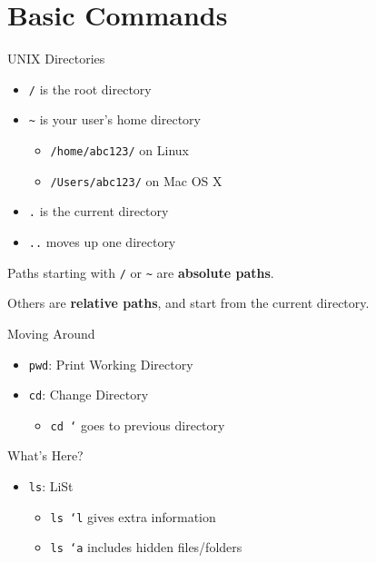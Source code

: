 \documentclass[pdf,usenames,dvipsnames,14pt]{beamer}%
\newcommand\hyphen{\char`\-}
\renewcommand\emph[1]{\textbf{#1}}
\begin{document}
\section{Basic Commands}

\begin{frame}{UNIX Directories}
	\begin{itemize}
		\item \texttt{/} is the root directory
		\item \texttt{\textasciitilde} is your user's home directory
		\begin{itemize}
			\item \texttt{/home/abc123/} on Linux
			\item \texttt{/Users/abc123/} on Mac OS X
		\end{itemize}
		\item \texttt{.} is the current directory
		\item \texttt{..} moves up one directory
	\end{itemize}
	Paths starting with \texttt{/} or \texttt{\textasciitilde} are \emph{absolute paths}.
	
	Others are \emph{relative paths}, and start from the current directory.
\end{frame}

\begin{frame}{Moving Around}
	\begin{itemize}
		\item \texttt{pwd}: Print Working Directory
		\item \texttt{cd}: Change Directory
		\begin{itemize}
			\item \texttt{cd \hyphen} goes to previous directory
		\end{itemize}
	\end{itemize}
\end{frame}

\begin{frame}{What's Here?}
	\begin{itemize}
		\item \texttt{ls}: LiSt
		\begin{itemize}
			\item \texttt{ls \hyphen l} gives extra information
			\item \texttt{ls \hyphen a} includes hidden files/folders
		\end{itemize}
	\end{itemize}
\end{frame}
\end{document}
